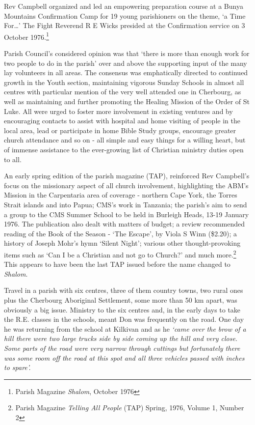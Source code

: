 Rev Campbell organized and led an empowering preparation course at a
Bunya Mountains Confirmation Camp for 19 young parishioners on the
theme, `a Time For\ldots' The Fight Reverend R E Wicks presided at the
Confirmation service on 3 October 1976.\footnote{Parish Magazine
  \emph{Shalom}, October 1976}

Parish Council's considered opinion was that `there is more than enough
work for two people to do in the parish' over and above the supporting
input of the many lay volunteers in all areas. The consensus was
emphatically directed to continued growth in the Youth section,
maintaining vigorous Sunday Schools in almost all centres with
particular mention of the very well attended one in Cherbourg, as well
as maintaining and further promoting the Healing Mission of the Order of
St Luke. All were urged to foster more involvement in existing ventures
and by encouraging contacts to assist with hospital and home visiting of
people in the local area, lead or participate in home Bible Study
groups, encourage greater church attendance and so on - all simple and
easy things for a willing heart, but of immense assistance to the
ever-growing list of Christian ministry duties open to all.

An early spring edition of the parish magazine (TAP), reinforced Rev
Campbell's focus on the missionary aspect of all church involvement,
highlighting the ABM's Mission in the Carpentaria area of coverage -
northern Cape York, the Torres Strait islands and into Papua; CMS's work
in Tanzania; the parish's aim to send a group to the CMS Summer School
to be held in Burleigh Heads, 13-19 January 1976. The publication also
dealt with matters of budget; a review recommended reading of the Book
of the Season - `The Escape', by Viola S Winn (\$2.20); a history of
Joseph Mohr's hymn `Silent Night'; various other thought-provoking items
such as `Can I be a Christian and not go to Church?' and much
more.\footnote{Parish Magazine \emph{Telling All People} (TAP) Spring,
  1976, Volume 1, Number 2} This appears to have been the last TAP
issued before the name changed to \emph{Shalom}.

Travel in a parish with six centres, three of them country towns, two
rural ones plus the Cherbourg Aboriginal Settlement, some more than 50
km apart, was obviously a big issue. Ministry to the six centres and, in
the early days to take the R.E. classes in the schools, meant Don was
frequently on the road. One day he was returning from the school at
Kilkivan and as he \emph{`came over the brow of a hill there were two
large trucks side by side coming up the hill and very close. Some parts
of the road were very narrow through cuttings but fortunately there was
some room off the road at this spot and all three vehicles passed with
inches to spare'.}

